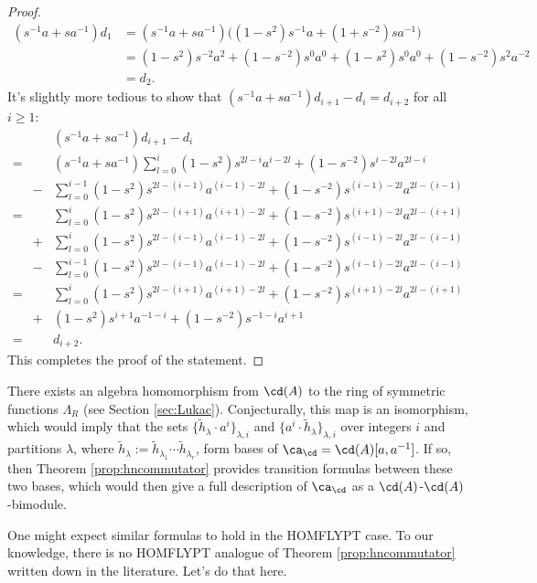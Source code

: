 \begin{proof}
\begin{align*}
( s^{-1} a + s a^{-1} ) d_1 &= ( s^{-1} a + s a^{-1} ) \big( ( 1 - s^2 ) s^{-1} a + ( 1 + s^{-2} ) s a^{-1} \big) \\
&= ( 1 - s^2 ) s^{-2} a^2 + (1 - s^{-2} ) s^0 a^0 + ( 1 - s^2 ) s^0 a^0 + ( 1 - s^{-2} ) s^2 a^{-2} \\
&= d_2.
\end{align*}
It's slightly more tedious to show that $( s^{-1} a + s a^{-1} ) d_{i+1} - d_i = d_{i+2}$ for all $i \geq 1$:
\begin{eqnarray*}
&&( s^{-1} a + s a^{-1} ) d_{i+1} - d_i \\
=&& ( s^{-1} a + s a^{-1} ) \sum_{l=0}^{i} (1 - s^2) s^{2l-i} a^{i-2l} + (1 - s^{-2}) s^{i-2l} a^{2l-i} \\
&-& \sum_{l=0}^{i-1} (1 - s^2) s^{2l-(i-1)} a^{(i-1)-2l} + (1 - s^{-2}) s^{(i-1)-2l} a^{2l-(i-1)} \\
=&& \sum_{l=0}^{i} (1 - s^2) s^{2l-(i+1)} a^{(i+1)-2l} + (1 - s^{-2}) s^{(i+1)-2l} a^{2l-(i+1)} \\
&+& \sum_{l=0}^{i} (1 - s^2) s^{2l-(i-1)} a^{(i-1)-2l} + (1 - s^{-2}) s^{(i-1)-2l} a^{2l-(i-1)} \\
&-& \sum_{l=0}^{i-1} (1 - s^2) s^{2l-(i-1)} a^{(i-1)-2l} + (1 - s^{-2}) s^{(i-1)-2l} a^{2l-(i-1)} \\
=&& \sum_{l=0}^{i} (1 - s^2) s^{2l-(i+1)} a^{(i+1)-2l} + (1 - s^{-2}) s^{(i+1)-2l} a^{2l-(i+1)} \\
&+& (1 - s^2) s^{i+1} a^{-1-i} + (1 - s^{-2}) s^{-1-i} a^{i+1} \\
=&& d_{i+2}.
\end{eqnarray*}
This completes the proof of the statement. 
\end{proof}

\begin{remark}
There exists an algebra homomorphism from $\cd(A)$ to the ring of symmetric functions $\Lambda_R$ (see Section \ref{sec:Lukac}). Conjecturally, this map is an isomorphism, which would imply that the sets $\{ \tilde{h}_\lambda \cdot a^i \}_{\lambda, i}$ and $\{ a^i \cdot \tilde{h}_\lambda \}_{\lambda, i}$ over integers $i$ and partitions $\lambda$, where $\tilde{h}_\lambda := \tilde{h}_{\lambda_1} \cdots \tilde{h}_{\lambda_r}$, form bases of $\ca_\cd = \cd(A)[a, a^{-1}]$. If so, then Theorem \ref{prop:hncommutator} provides transition formulas between these two bases, which would then give a full description of $\ca_\cd$ as a $\cd(A)$-$\cd(A)$-bimodule. 
\end{remark}

One might expect similar formulas to hold in the HOMFLYPT case. To our knowledge, there is no HOMFLYPT analogue of Theorem \ref{prop:hncommutator} written down in the literature. Let's do that here. 

